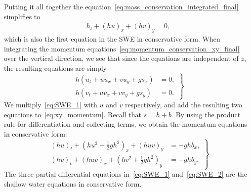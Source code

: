 Putting it all together the equation~\eqref{eq:mass_conservation_integrated_final} simplifies to
\begin{align}\label{eq:SWE_1}
    h_t + {(hu)}_x + {(hv)}_y = 0,
\end{align}
which is also the first equation in the SWE in conservative form.
When integrating the momentum equations~\eqref{eq:momentum_conservation_xy_final} over the vertical direction, we see that since the equations are independent of $z$, the resulting equations are simply
\begin{equation}\label{eq:xy_momentum}
    \left.
    \begin{aligned}
        h(u_t + uu_x + vu_y + g s_x) &= 0,\\
        h(v_t + uv_x + vv_y + g s_y) &= 0.
    \end{aligned}
    \right\}
\end{equation}
We multiply~\eqref{eq:SWE_1} with $u$ and $v$ respectively, and add the resulting two equations to~\eqref{eq:xy_momentum}.
Recall that $s = h + b$. 
By using the product rule for differentiation and collecting terms, we obtain the momentum equations in conservative form:
\begin{equation}\label{eq:SWE_2}
    \left.
    \begin{aligned}
        {(hu)}_t + {(hu^2 + \frac{1}{2}gh^2)}_x + {(huv)}_y &= -gh b_x,\\
        {(hv)}_t + {(huv)}_x + {(hv^2 + \frac{1}{2}gh^2)}_y &= -gh b_y.
    \end{aligned}
    \right\}
\end{equation}
The three partial differential equations in~\eqref{eq:SWE_1} and~\eqref{eq:SWE_2} are the shallow water equations in conservative form.

